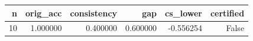 \begin{tabular}{rrrrrr}
\toprule
n & orig_acc & consistency & gap & cs_lower & certified \\
\midrule
10 & 1.000000 & 0.400000 & 0.600000 & -0.556254 & False \\
\bottomrule
\end{tabular}
